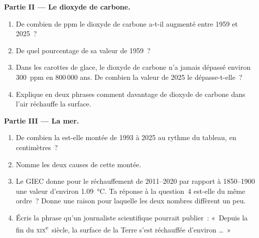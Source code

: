 \begin{problem}
\noindent\textbf{Partie II --- Le dioxyde de carbone.}\par\nopagebreak
\begin{enumerate}[resume, beginpenalty=10000]
  \item De combien de ppm le dioxyde de carbone a-t-il augmenté entre 1959
        et 2025~?
  \item De quel pourcentage de sa valeur de 1959~?
  \item Dans les carottes de glace, le dioxyde de carbone n'a jamais
        dépassé environ \qty{300}{ppm} en 800\,000 ans. De combien la
        valeur de 2025 le dépasse-t-elle~?
  \item Explique en deux phrases comment davantage de dioxyde de carbone
        dans l'air réchauffe la surface.
\end{enumerate}

\noindent\textbf{Partie III --- La mer.}\par\nopagebreak
\begin{enumerate}[resume, beginpenalty=10000]
  \item De combien la  est-elle montée de 1993 à 2025 au rythme du
        tableau, en centimètres~?
  \item Nomme les deux causes de cette montée.
  \item Le GIEC donne pour le réchauffement de 2011--2020 par rapport à
        1850--1900 une valeur d'environ \qty{1.09}{\degreeCelsius}. Ta
        réponse à la question~4 est-elle du même ordre~? Donne une raison
        pour laquelle les deux nombres diffèrent un peu.
  \item Écris la phrase qu'un journaliste scientifique pourrait publier~:
        «~Depuis la fin du \textsc{xix}\textsuperscript{e}~siècle, la
        surface de la Terre s'est réchauffée d'environ \ldots~»
\end{enumerate}
\end{problem}
